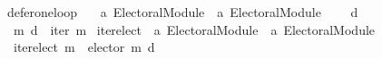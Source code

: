 \begin{isabellebody}
\isanewline
{}\isamarkupfalse%
\ defer{\isacharunderscore}{\kern0pt}one{\isacharunderscore}{\kern0pt}loop\ {\isacharcolon}{\kern0pt}{\isacharcolon}{\kern0pt}\isanewline
\ \ {\isachardoublequoteopen}{\isacharprime}{\kern0pt}a\ Electoral{\isacharunderscore}{\kern0pt}Module\ {\isasymRightarrow}\ {\isacharprime}{\kern0pt}a\ Electoral{\isacharunderscore}{\kern0pt}Module{\isachardoublequoteclose}\isanewline
\ \ \ \ {\isacharparenleft}{\kern0pt}{\isachardoublequoteopen}{\isacharunderscore}{\kern0pt}{\isasymcirclearrowleft}\isactrlsub {\isasymexists}\isactrlsub {\isacharbang}{\kern0pt}\isactrlsub d{\isachardoublequoteclose}\ {}{}{\isacharparenright}{\kern0pt}\ \isanewline
\ \ {\isachardoublequoteopen}m\ {\isasymcirclearrowleft}\isactrlsub {\isasymexists}\isactrlsub {\isacharbang}{\kern0pt}\isactrlsub d\ {\isasymequiv}\ iter\ m{\isachardoublequoteclose}\isanewline
\isanewline
{}\isamarkupfalse%
\ iterelect\ {\isacharcolon}{\kern0pt}{\isacharcolon}{\kern0pt}\ {\isachardoublequoteopen}{\isacharprime}{\kern0pt}a\ Electoral{\isacharunderscore}{\kern0pt}Module\ {\isasymRightarrow}\ {\isacharprime}{\kern0pt}a\ Electoral{\isacharunderscore}{\kern0pt}Module{\isachardoublequoteclose}\ \isanewline
\ \ {\isachardoublequoteopen}iterelect\ m\ {\isacharequal}{\kern0pt}\ elector\ {\isacharparenleft}{\kern0pt}m\ {\isasymcirclearrowleft}\isactrlsub {\isasymexists}\isactrlsub {\isacharbang}{\kern0pt}\isactrlsub d{\isacharparenright}{\kern0pt}{\isachardoublequoteclose}\isanewline
%
\isadelimtheory
\isanewline
%
\endisadelimtheory
%
\isatagtheory
{}\isamarkupfalse%
%
\endisatagtheory
{\isafoldtheory}%
%
\isadelimtheory
%
\endisadelimtheory
%
\end{isabellebody}%
\endinput
